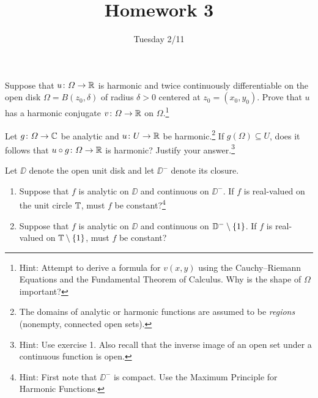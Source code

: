 \documentclass{../math135}
\title{Homework 3}
\author{}
\date{Tuesday 2/11}
\begin{document}
\begin{exercise}
	Suppose that \(u \colon \Omega\to\mathbb R\) is harmonic and twice
  continuously differentiable on the open disk
  \(\Omega = B(z_0, \delta)\) of radius \(\delta > 0\) centered at
  \(z_0 = (x_0, y_0)\).  Prove that \(u\) has a harmonic conjugate
  \(v \colon \Omega\to\mathbb R\) on \(\Omega\).\footnote{Hint: Attempt to
    derive a formula for \(v(x, y)\) using the Cauchy--Riemann
    Equations and the Fundamental Theorem of Calculus.  Why is the
    shape of \(\Omega\) important?}
\end{exercise}


\begin{exercise}
	Let \(g \colon \Omega\to\mathbb C\) be analytic and \(u \colon U\to\mathbb R\)
  be harmonic.\footnote{The domains of analytic or harmonic functions
    are assumed to be \emph{regions} (nonempty, connected open sets).}
  If \(g(\Omega) \subseteq U\), does it follows that
  \(u \circ g \colon \Omega\to\mathbb R\) is harmonic?  Justify your
  answer.\footnote{Hint: Use exercise 1.  Also recall that the inverse
    image of an open set under a continuous function is open.}%
\end{exercise}

\begin{exercise}
  Let \(\DD\) denote the open unit disk and let \(\DD^-\) denote its
  closure.
  \begin{enumerate}
	\item Suppose that \(f\) is analytic on \(\DD\) and continuous on
    \(\DD^-\).  If \(f\) is real-valued on the unit circle \(\mathbb T\),
    must \(f\) be constant?\footnote{Hint: First note that \(\DD^-\)
      is compact.  Use the Maximum Principle for Harmonic Functions.}%


	\item Suppose that \(f\) is analytic on \(\DD\) and continuous on
    \(\mathbb D^- \setminus \{1\}\).  If \(f\) is real-valued on
    \(\mathbb T \setminus \{1\}\), must \(f\) be constant?


  \end{enumerate}
\end{exercise}
\end{document}
